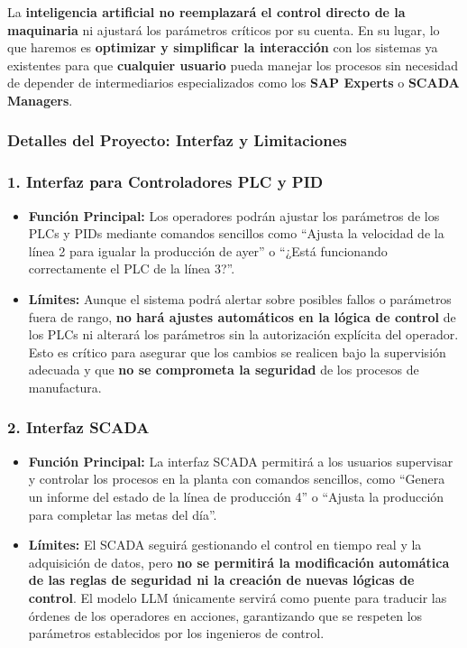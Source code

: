 \documentclass[
  10pt,
  letterpaper,
]{book}
\providecommand{\tightlist}{%
  \setlength{\itemsep}{0pt}\setlength{\parskip}{0pt}}\usepackage{longtable,booktabs,array}
\begin{document}
La \textbf{inteligencia artificial no reemplazará el control directo de
la maquinaria} ni ajustará los parámetros críticos por su cuenta. En su
lugar, lo que haremos es \textbf{optimizar y simplificar la interacción}
con los sistemas ya existentes para que \textbf{cualquier usuario} pueda
manejar los procesos sin necesidad de depender de intermediarios
especializados como los \textbf{SAP Experts} o \textbf{SCADA Managers}.

\subsubsection{Detalles del Proyecto: Interfaz y
Limitaciones}\label{detalles-del-proyecto-interfaz-y-limitaciones}

\subsubsection{\texorpdfstring{1. \textbf{Interfaz para Controladores
PLC y
PID}}{1. Interfaz para Controladores PLC y PID}}\label{interfaz-para-controladores-plc-y-pid}

\begin{itemize}
\tightlist
\item
  \textbf{Función Principal:} Los operadores podrán ajustar los
  parámetros de los PLCs y PIDs mediante comandos sencillos como
  ``Ajusta la velocidad de la línea 2 para igualar la producción de
  ayer'' o ``¿Está funcionando correctamente el PLC de la línea 3?''.
\item
  \textbf{Límites:} Aunque el sistema podrá alertar sobre posibles
  fallos o parámetros fuera de rango, \textbf{no hará ajustes
  automáticos en la lógica de control} de los PLCs ni alterará los
  parámetros sin la autorización explícita del operador. Esto es crítico
  para asegurar que los cambios se realicen bajo la supervisión adecuada
  y que \textbf{no se comprometa la seguridad} de los procesos de
  manufactura.
\end{itemize}

\subsubsection{\texorpdfstring{2. \textbf{Interfaz
SCADA}}{2. Interfaz SCADA}}\label{interfaz-scada}

\begin{itemize}
\tightlist
\item
  \textbf{Función Principal:} La interfaz SCADA permitirá a los usuarios
  supervisar y controlar los procesos en la planta con comandos
  sencillos, como ``Genera un informe del estado de la línea de
  producción 4'' o ``Ajusta la producción para completar las metas del
  día''.
\item
  \textbf{Límites:} El SCADA seguirá gestionando el control en tiempo
  real y la adquisición de datos, pero \textbf{no se permitirá la
  modificación automática de las reglas de seguridad ni la creación de
  nuevas lógicas de control}. El modelo LLM únicamente servirá como
  puente para traducir las órdenes de los operadores en acciones,
  garantizando que se respeten los parámetros establecidos por los
  ingenieros de control.
\end{itemize}
\end{document}
